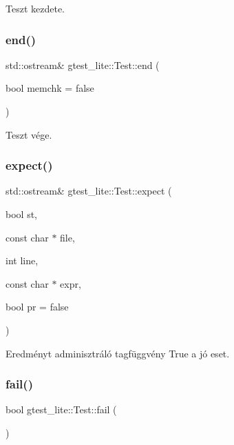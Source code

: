 Teszt kezdete. 

\mbox{\label{structgtest__lite_1_1_test_a658c1eee35f170294c354ebf4d3fc1ba}} 
\subsubsection{\texorpdfstring{end()}{end()}}
{\footnotesize\ttfamily std\+::ostream\& gtest\+\_\+lite\+::\+Test\+::end (\begin{DoxyParamCaption}\item[{bool}]{memchk = {\ttfamily false} }\end{DoxyParamCaption})\hspace{0.3cm}{\ttfamily [inline]}}



Teszt vége. 

\mbox{\label{structgtest__lite_1_1_test_a0bca03315e5963f7fdfffd92d2daed6a}} 
\subsubsection{\texorpdfstring{expect()}{expect()}}
{\footnotesize\ttfamily std\+::ostream\& gtest\+\_\+lite\+::\+Test\+::expect (\begin{DoxyParamCaption}\item[{bool}]{st,  }\item[{const char $\ast$}]{file,  }\item[{int}]{line,  }\item[{const char $\ast$}]{expr,  }\item[{bool}]{pr = {\ttfamily false} }\end{DoxyParamCaption})\hspace{0.3cm}{\ttfamily [inline]}}



Eredményt adminisztráló tagfüggvény True a jó eset. 

\mbox{\label{structgtest__lite_1_1_test_aadbfd0f53c56d975f793602996631195}} 
\subsubsection{\texorpdfstring{fail()}{fail()}}
{\footnotesize\ttfamily bool gtest\+\_\+lite\+::\+Test\+::fail (\begin{DoxyParamCaption}{ }\end{DoxyParamCaption})\hspace{0.3cm}{\ttfamily [inline]}}

